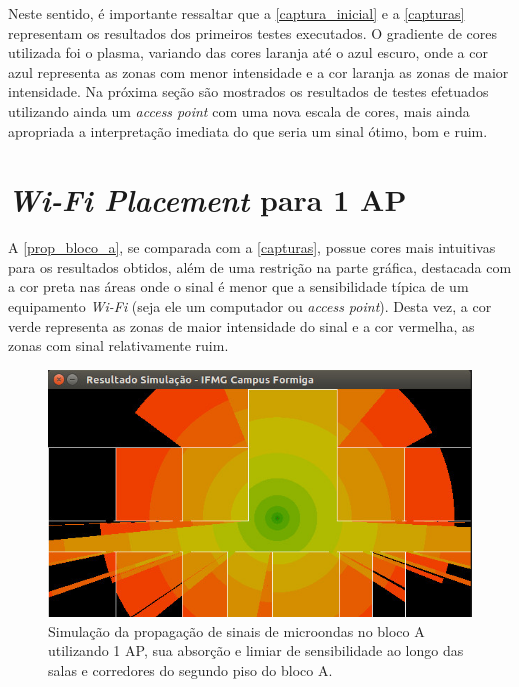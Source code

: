 \documentclass[
	12pt,				%
	twoside,			%
	a4paper,			%
	english,			%
	french,				%
	spanish,			%
	brazil				%
	]{abntex2}
\begin{document}
Neste sentido, é importante ressaltar que a \autoref{captura_inicial} e
a \autoref{capturas} representam os resultados dos primeiros testes
executados. O gradiente de cores utilizada foi o plasma, variando das
cores laranja até o azul escuro, onde a cor azul representa as zonas com
menor intensidade e a cor laranja as zonas de maior intensidade. Na
próxima seção são mostrados os resultados de testes efetuados utilizando
ainda um \emph{access point} com uma nova escala de cores, mais ainda
apropriada a interpretação imediata do que seria um sinal ótimo, bom e
ruim.

\section{\texorpdfstring{\emph{Wi-Fi Placement} para 1
AP}{Wi-Fi Placement para 1 AP}}\label{wi-fi-placement-para-1-ap}

A \autoref{prop_bloco_a}, se comparada com a \autoref{capturas}, possue
cores mais intuitivas para os resultados obtidos, além de uma restrição
na parte gráfica, destacada com a cor preta nas áreas onde o sinal é
menor que a sensibilidade típica de um equipamento \emph{Wi-Fi} (seja
ele um computador ou \emph{access point}). Desta vez, a cor verde
representa as zonas de maior intensidade do sinal e a cor vermelha, as
zonas com sinal relativamente ruim.

\begin{figure}[ht]
    \caption{\label{prop_bloco_a} Simulação da propagação de sinais de microondas no bloco A utilizando 1 AP, sua absorção e limiar de sensibilidade ao longo das salas e corredores do segundo piso do bloco A.}
    \begin{center}
        \includegraphics[scale=0.7]{imagens/prop-bloco-a-2.jpg}
    \end{center}
\end{figure}
\end{document}
